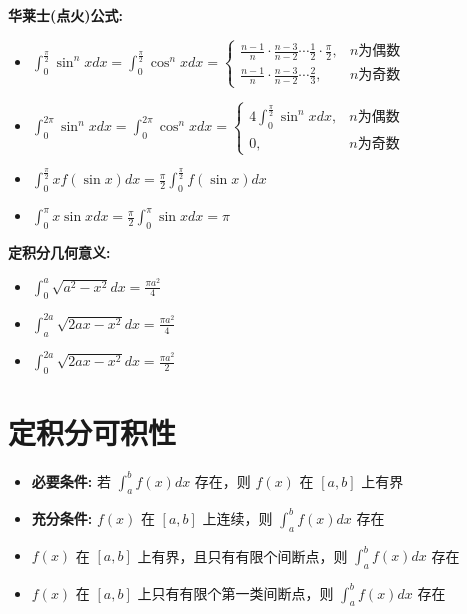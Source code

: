 \documentclass[10pt]{article}
\begin{document}
\begin{multicols*}{2}
\textbf{华莱士(点火)公式:}
\begin{itemize}
  \item \(\int_0^{\frac{\pi}{2}} \sin^n x dx = \int_0^{\frac{\pi}{2}} \cos^n x dx = \begin{cases} 
  \frac{n-1}{n} \cdot \frac{n-3}{n-2} \cdots \frac{1}{2} \cdot \frac{\pi}{2}, & n \text{为偶数} \\
  \frac{n-1}{n} \cdot \frac{n-3}{n-2} \cdots \frac{2}{3}, & n \text{为奇数}
  \end{cases}\)
  \item \(\int_0^{2\pi} \sin^n x dx = \int_0^{2\pi} \cos^n x dx = \begin{cases} 
  4\int_0^{\frac{\pi}{2}} \sin^n x dx, & n \text{为偶数} \\
  0, & n \text{为奇数}
  \end{cases}\)
  \item \(\int_0^{\frac{\pi}{2}} x f(\sin x)dx = \frac{\pi}{2}\int_0^{\frac{\pi}{2}} f(\sin x)dx\)
  \item \(\int_0^{\pi} x \sin x dx = \frac{\pi}{2}\int_0^{\pi} \sin x dx = \pi\)
\end{itemize}

\textbf{定积分几何意义:}
\begin{itemize}
  \item \(\int_0^a \sqrt{a^2 - x^2}dx = \frac{\pi a^2}{4}\)
  \item \(\int_a^{2a} \sqrt{2ax - x^2}dx = \frac{\pi a^2}{4}\)
  \item \(\int_0^{2a} \sqrt{2ax - x^2}dx = \frac{\pi a^2}{2}\)
\end{itemize}

\section*{定积分可积性}
\vspace{-8pt}

\begin{itemize}
  \item \textbf{必要条件:} 若 \(\int_a^b f(x)dx\) 存在，则 \(f(x)\) 在 \([a,b]\) 上有界
  \item \textbf{充分条件:} \(f(x)\) 在 \([a,b]\) 上连续，则 \(\int_a^b f(x)dx\) 存在
  \item \(f(x)\) 在 \([a,b]\) 上有界，且只有有限个间断点，则 \(\int_a^b f(x)dx\) 存在
  \item \(f(x)\) 在 \([a,b]\) 上只有有限个第一类间断点，则 \(\int_a^b f(x)dx\) 存在
\end{itemize}


\end{multicols*}
\end{document}
